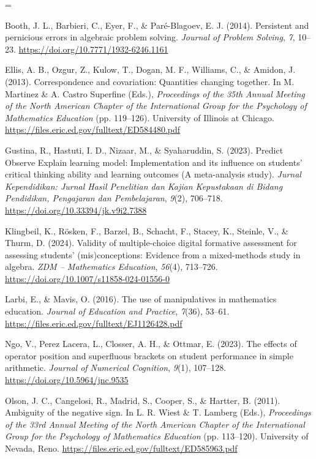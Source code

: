 \documentclass[a4paper,12pt]{article}
\begin{document}
{\TimesEn\linespread{1.0}\fontsize{10.8pt}{16.2pt}\selectfont
\setlength{\parskip}{3.0pt}
\everypar={\hangindent=0.85cm }

Booth, J. L., Barbieri, C., Eyer, F., \& Paré-Blagoev, E. J. (2014). Persistent and pernicious errors in algebraic problem solving. \textit{Journal of Problem Solving}, \textit{7}, 10--23. \url{https://doi.org/10.7771/1932-6246.1161}

Ellis, A. B., Ozgur, Z., Kulow, T., Dogan, M. F., Williams, C., \& Amidon, J. (2013). Correspondence and covariation: Quantities changing together. In M. Martinez \& A. Castro Superfine (Eds.), \textit{Proceedings of the 35th Annual Meeting of the North American Chapter of the International Group for the Psychology of Mathematics Education} (pp. 119--126). University of Illinois at Chicago. \url{https://files.eric.ed.gov/fulltext/ED584480.pdf}

Gustina, R., Hastuti, I. D., Nizaar, M., \& Syaharuddin, S. (2023). Predict Observe Explain learning model: Implementation and its influence on students' critical thinking ability and learning outcomes (A meta-analysis study). \textit{Jurnal Kependidikan: Jurnal Hasil Penelitian dan Kajian Kepustakaan di Bidang Pendidikan, Pengajaran dan Pembelajaran}, \textit{9}(2), 706--718. \url{https://doi.org/10.33394/jk.v9i2.7388}

Klingbeil, K., Rösken, F., Barzel, B., Schacht, F., Stacey, K., Steinle, V., \& Thurm, D. (2024). Validity of multiple-choice digital formative assessment for assessing students' (mis)conceptions: Evidence from a mixed-methods study in algebra. \textit{ZDM -- Mathematics Education}, \textit{56}(4), 713--726. \url{https://doi.org/10.1007/s11858-024-01556-0}

Larbi, E., \& Mavis, O. (2016). The use of manipulatives in mathematics education. \textit{Journal of Education and Practice}, \textit{7}(36), 53--61. \url{https://files.eric.ed.gov/fulltext/EJ1126428.pdf}

Ngo, V., Perez Lacera, L., Closser, A. H., \& Ottmar, E. (2023). The effects of operator position and superfluous brackets on student performance in simple arithmetic. \textit{Journal of Numerical Cognition}, \textit{9}(1), 107--128. \url{https://doi.org/10.5964/jnc.9535}

Olson, J. C., Cangelosi, R., Madrid, S., Cooper, S., \& Hartter, B. (2011). Ambiguity of the negative sign. In L. R. Wiest \& T. Lamberg (Eds.), \textit{Proceedings of the 33rd Annual Meeting of the North American Chapter of the International Group for the Psychology of Mathematics Education} (pp. 113--120). University of Nevada, Reno. \url{https://files.eric.ed.gov/fulltext/ED585963.pdf}

}
\end{document}
